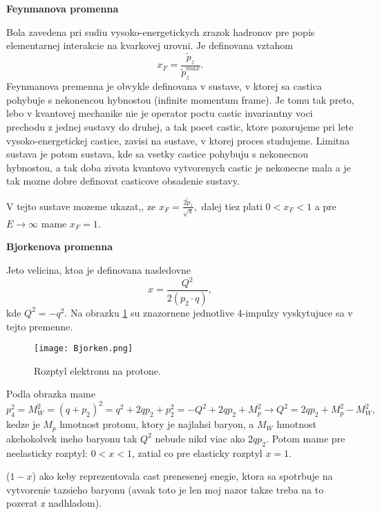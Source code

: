 \documentclass[../../main.tex]{subfiles}
\begin{document}
\textbf{Feynmanova promenna}\par
Bola zavedena pri sudiu vysoko-energetickych zrazok hadronov pre popis elementarnej interakcie na kvarkovej urovni. Je definovana vztahom $$ x_F=\frac{\tilde{p}_z}{\tilde{p}_z^{max}}. $$
Feynmanova premenna je obvykle definovana v sustave, v ktorej sa castica pohybuje s nekonencou hybnostou (infinite momentum frame). Je tomu tak preto, lebo v kvantovej mechanike nie je operator poctu castic invariantny voci prechodu z jednej sustavy do druhej, a tak pocet castic, ktore pozorujeme pri lete vysoko-energetickej castice, zavisi na sustave, v ktorej proces studujeme. Limitna sustava je potom sustava, kde sa vsetky castice pohybuju s nekonecnou hybnostou, a tak doba zivota kvantovo vytvorenych castic je nekonecne mala a je tak mozne dobre definovat casticove obsadenie sustavy.\par
V tejto sustave mozeme ukazat,, ze $x_F=\frac{2\tilde{p}_z}{\sqrt{s}},$ dalej tiez plati $0<x_F<1$ a pre $E\rightarrow \infty$ mame $x_F=1$.\newline

\textbf{Bjorkenova promenna}\par
Jeto velicina, ktoa je definovana nasledovne $$ x=\frac{Q^2}{2(p_2\cdot q)}, $$ kde $Q^2=-q^2$. Na obrazku \ref{sf1:fig:Bjorken} su znazornene jednotlive 4-impulzy vyskytujuce sa v tejto premenne.
\begin{figure}[!h]
\centering
\texttt{[image: Bjorken.png]}
\caption{Rozptyl elektronu na protone.}
\label{sf1:fig:Bjorken}
\end{figure}
Podla obrazka mame
$$ p_4^2=M_W^2=(q+p_2)^2=q^2+2qp_2+p_2^2=-Q^2+2qp_2+M_p^2\rightarrow Q^2=2qp_2+M_p^2-M_W^2, $$
kedze je $M_p$ hmotnost protonu, ktory je najlahsi baryon, a $M_W$ hmotnost akehokolvek ineho baryonu tak $Q^2$ nebude nikd viac ako $2qp_2$.
Potom mame pre neelasticky rozptyl: $0<x<1$, zatial co pre elasticky rozptyl $x=1$.\par
($1-x$) ako keby reprezentovala cast prenesenej enegie, ktora sa spotrbuje na vytvorenie tazsieho baryonu (avsak toto je len moj nazor takze treba na to pozerat z nadhladom).
\end{document}
